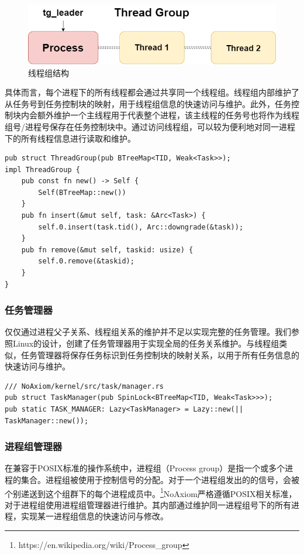 \documentclass{article}
\begin{document}
\begin{figure}[H]
    \centering
    \includegraphics[width=0.5\linewidth]{assets//task/thread_group.drawio.png}
    \caption{线程组结构}
    \label{fig:thread_group_structure}
\end{figure}

具体而言，每个进程下的所有线程都会通过共享同一个线程组。线程组内部维护了从任务号到任务控制块的映射，用于线程组信息的快速访问与维护。此外，任务控制块内会额外维护一个主线程用于代表整个进程，该主线程的任务号也将作为线程组号/进程号保存在任务控制块中。通过访问线程组，可以较为便利地对同一进程下的所有线程信息进行读取和维护。

\begin{lstlisting}
pub struct ThreadGroup(pub BTreeMap<TID, Weak<Task>>);
impl ThreadGroup {
    pub const fn new() -> Self {
        Self(BTreeMap::new())
    }
    pub fn insert(&mut self, task: &Arc<Task>) {
        self.0.insert(task.tid(), Arc::downgrade(&task));
    }
    pub fn remove(&mut self, taskid: usize) {
        self.0.remove(&taskid);
    }
}
\end{lstlisting}

\subsubsection{任务管理器}

仅仅通过进程父子关系、线程组关系的维护并不足以实现完整的任务管理。我们参照Linux的设计，创建了任务管理器用于实现全局的任务关系维护。与线程组类似，任务管理器将保存任务标识到任务控制块的映射关系，以用于所有任务信息的快速访问与维护。

\begin{lstlisting}
/// NoAxiom/kernel/src/task/manager.rs
pub struct TaskManager(pub SpinLock<BTreeMap<TID, Weak<Task>>>);
pub static TASK_MANAGER: Lazy<TaskManager> = Lazy::new(|| TaskManager::new());
\end{lstlisting}

\subsubsection{进程组管理器}

在兼容于POSIX标准的操作系统中，进程组（Process group）是指一个或多个进程的集合。进程组被使用于控制信号的分配。对于一个进程组发出的的信号，会被个别递送到这个组群下的每个进程成员中。\footnote{https://en.wikipedia.org/wiki/Process\_group}NoAxiom严格遵循POSIX相关标准，对于进程组使用进程组管理器进行维护。其内部通过维护同一进程组号下的所有进程，实现某一进程组信息的快速访问与修改。
\end{document}
